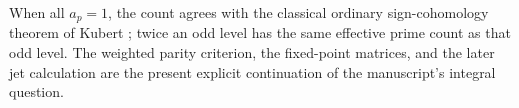 When all $a_p=1$, the count agrees with the classical ordinary
sign-cohomology theorem of Kubert \cite{kubert-sign}; twice an odd
level has the same effective prime count as that odd level. The
weighted parity criterion, the fixed-point matrices, and the later
jet calculation are the present explicit continuation of the
manuscript's integral question.
